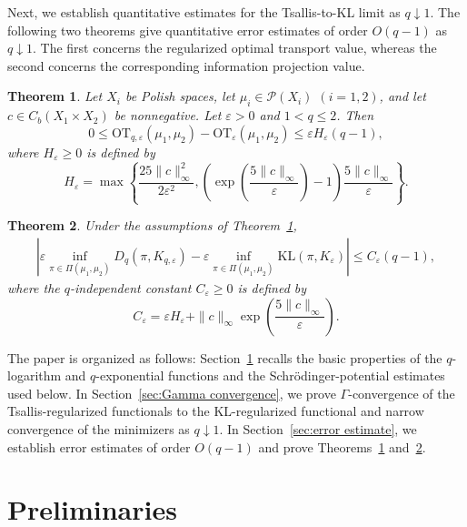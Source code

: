 \documentclass[a4paper,11pt]{article}
\theoremstyle{plain}
\newtheorem{thm}{Theorem}[section]
\theoremstyle{definition}
\theoremstyle{remark}
\theoremstyle{plain}
\numberwithin{equation}{section}
\newcommand{\ep}{\varepsilon}
\newcommand{\1}{\mbox{1}\hspace{-0.25em}\mbox{l}} %
\begin{document}
Next, we establish quantitative estimates for the Tsallis-to-KL limit as $q\downarrow1$. The following two theorems give quantitative error estimates of order $O(q-1)$ as $q\downarrow1$. The first concerns the regularized optimal transport value, whereas the second concerns the corresponding information projection value.

\begin{thm}\label{thm;2}
Let $X_i$ be Polish spaces, let $\mu_i\in\mathcal P(X_i)$ $(i=1,2)$, and let $c\in C_b(X_1\times X_2)$ be nonnegative. Let $\ep>0$ and $1<q\leq2$. Then
\begin{equation*}
0\leq\mathrm{OT}_{q, \ep}(\mu_1, \mu_2) - \mathrm{OT}_\ep(\mu_1, \mu_2) \leq \ep H_\ep(q - 1),
\end{equation*}
where $H_\ep\geq0$ is defined by
\begin{equation*}
H_\ep = \max \left\{ \frac{25 \|c\|_\infty^2}{2\ep^2}, \left( \exp\left(\frac{5\|c\|_\infty}{\ep}\right)-1 \right)\frac{5 \|c\|_\infty}{\ep}
\right\}. 
\end{equation*}
\end{thm}

\begin{thm}\label{thm;3}
Under the assumptions of Theorem~\ref{thm;2},
\begin{align*}
\left|\ep \inf_{\pi \in \Pi(\mu_1, \mu_2)} D_q(\pi, K_{q,\ep})
-\ep \inf_{\pi \in \Pi(\mu_1, \mu_2)} \mathrm{KL}(\pi, K_{\ep})\right|
\le C_\ep (q-1),
\end{align*}
where the $q$-independent constant $C_\ep\geq0$ is defined by
\begin{equation*}
C_\ep = \ep H_\ep+\|c\|_\infty\exp\left(\frac{5\|c\|_\infty}{\ep}\right).
\end{equation*}
\end{thm}

The paper is organized as follows: Section~\ref{pre} recalls the basic properties of the $q$-logarithm and $q$-exponential functions and the Schr\"odinger-potential estimates used below. In Section~\ref{sec:Gamma convergence}, we prove $\Gamma$-convergence of the Tsallis-regularized functionals to the KL-regularized functional and narrow convergence of the minimizers as $q\downarrow1$. In Section~\ref{sec:error estimate}, we establish error estimates of order $O(q-1)$ and prove Theorems~\ref{thm;2} and~\ref{thm;3}.

\section{Preliminaries}\label{pre}
\end{document}
